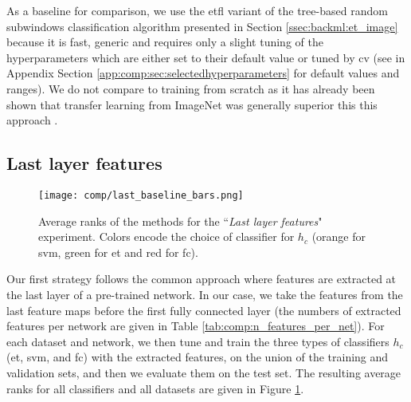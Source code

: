 As a baseline for comparison, we use the \acrshort{etfl} variant of the tree-based random subwindows classification algorithm presented in Section \ref{ssec:backml:et_image} because it is fast, generic and requires only a slight tuning of the hyperparameters which are either set to their default value or tuned by \acrlong{cv} (see in Appendix Section \ref{app:comp:sec:selectedhyperparameters} for default values and ranges). We do not compare to training from scratch as it has already been shown that transfer learning from ImageNet was generally superior this this approach \cite{shin2016deep, tajbakhsh2016convolutional}.

\subsection{Last layer features}
\label{ssec:comp:exp_last_layer}

\begin{figure}
    \centering
    \texttt{[image: comp/last\_baseline\_bars.png]}
    \caption{Average ranks of the methods for the ``\textit{Last layer features}" experiment. Colors encode the choice of classifier for $h_c$ (orange for \acrshort{svm}, green for \acrshort{et} and red for \acrshort{fc}).}
    \label{fig:comp:avg_ranks_last_layer}
\end{figure}

Our first strategy follows the common approach where features are extracted at the last layer of a pre-trained network. In our case, we take the features from the last feature maps before the first fully connected layer (the numbers of extracted features per network are given in Table \ref{tab:comp:n_features_per_net}). For each dataset and network, we then tune and train the three types of classifiers $h_c$ (\acrshort{et}, \acrshort{svm}, and \acrshort{fc}) with the extracted features, on the union of the training and validation sets, and then we evaluate them on the test set. The resulting average ranks for all classifiers and all datasets are given in Figure \ref{fig:comp:avg_ranks_last_layer}.

